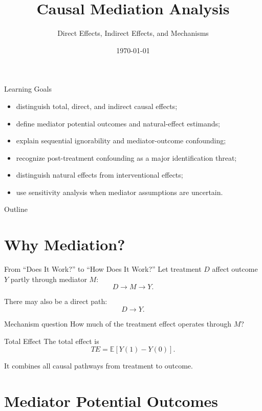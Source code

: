 \documentclass[aspectratio=169,11pt]{beamer}
\title[Causal Mediation]{Causal Mediation Analysis}
\subtitle{Direct Effects, Indirect Effects, and Mechanisms}
\date{\today}
\newcommand{\E}{\mathbb{E}}
\begin{document}
\begin{frame}
\titlepage
\end{frame}

\begin{frame}{Learning Goals}
\begin{itemize}
\item distinguish total, direct, and indirect causal effects;
\item define mediator potential outcomes and natural-effect estimands;
\item explain sequential ignorability and mediator-outcome confounding;
\item recognize post-treatment confounding as a major identification threat;
\item distinguish natural effects from interventional effects;
\item use sensitivity analysis when mediator assumptions are uncertain.
\end{itemize}
\end{frame}

\begin{frame}{Outline}
\tableofcontents
\end{frame}

\section{Why Mediation?}

\begin{frame}{From “Does It Work?” to “How Does It Work?”}
Let treatment \(D\) affect outcome \(Y\) partly through mediator \(M\):
\[
D \rightarrow M \rightarrow Y.
\]

There may also be a direct path:
\[
D \rightarrow Y.
\]

\begin{block}{Mechanism question}
How much of the treatment effect operates through \(M\)?
\end{block}
\end{frame}

\begin{frame}{Total Effect}
The total effect is
\[
TE=\E[Y(1)-Y(0)].
\]

It combines all causal pathways from treatment to outcome.
\end{frame}

\section{Mediator Potential Outcomes}
\end{document}
